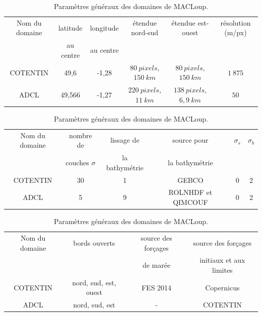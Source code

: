 \documentclass[10pt,a4paper,titlepage]{article}
\begin{document}
    
\begin{table}[h!]
    \begin{tabular}{||c||c|c|c|c|c|}
        \hline
        Nom du domaine & latitude & longitude & étendue nord-sud & étendue est-ouest & résolution (m/px)\\
        & au centre & au centre &  &  & \\
        \hline
        COTENTIN & 49,6 & -1,28 & $80~pixels$, $150~km$ & $80~pixels$, $150~km$ & $1~875$\\
        ADCL & 49,566 & -1,27 & $220~pixels$, $11~km$ & $138~pixels$, $6,9~km$ & $50$\\
        \hline
    \end{tabular}\newline
    
    \begin{tabular}{||c||c|c|c|c|c|}
        \hline
        Nom du domaine & nombre de & lissage de & source pour  &$\sigma_{s}$ & $\sigma_{b}$ \\
        & couches $\sigma$ & la bathymétrie & la bathymétrie  & & \\
        \hline
        COTENTIN & 30 & 1 & GEBCO & 0  & 2 \\
        ADCL & 5 & 9 & ROLNHDF et QIMCOUF & 0 & 2 \\
        \hline
    \end{tabular}\newline
    
    \begin{tabular}{||c||c|c|c|}
        \hline
        Nom du domaine & bords ouverts & source des forçages & source des forçages \\
        &  & de marée & initiaux et aux limites \\
        \hline
        COTENTIN & nord, sud, est, ouest & FES 2014 & Copernicus \\
        ADCL & nord, sud, est & - & COTENTIN \\
        \hline
    \end{tabular}
    \caption{
        Paramètres généraux des domaines de MACLoup.
    }
    \label{table:param_generaux}
\end{table}

\end{document}
